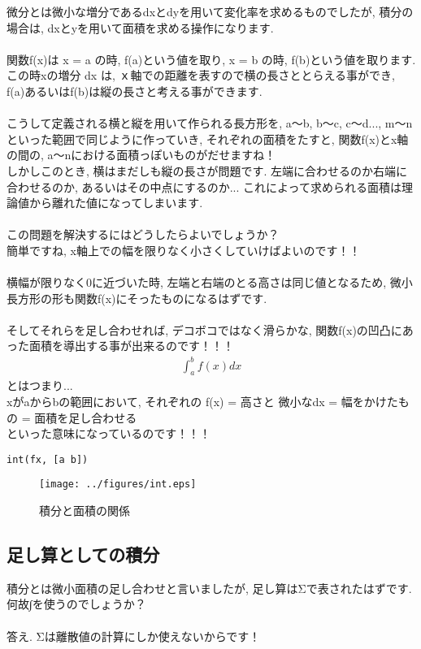 \documentclass[11pt,a4paper]{ujreport}
\begin{document}
微分とは微小な増分であるdxとdyを用いて変化率を求めるものでしたが, 積分の場合は, dxとyを用いて面積を求める操作になります.\\
\\
関数f(x)は x = a の時, f(a)という値を取り, x = b の時, f(b)という値を取ります. この時xの増分 dx は, ｘ軸での距離を表すので横の長さととらえる事ができ, f(a)あるいはf(b)は縦の長さと考える事ができます.\\
\\
こうして定義される横と縦を用いて作られる長方形を, a～b, b～c, c～d..., m～nといった範囲で同じように作っていき, それぞれの面積をたすと, 関数f(x)とx軸の間の, a～nにおける面積っぽいものがだせますね！\\
しかしこのとき, 横はまだしも縦の長さが問題です. 左端に合わせるのか右端に合わせるのか, あるいはその中点にするのか... これによって求められる面積は理論値から離れた値になってしまいます.\\
\\
この問題を解決するにはどうしたらよいでしょうか？\\
簡単ですね, x軸上での幅を限りなく小さくしていけばよいのです！！\\
\\
横幅が限りなく0に近づいた時, 左端と右端のとる高さは同じ値となるため, 微小長方形の形も関数f(x)にそったものになるはずです.\\
\\
そしてそれらを足し合わせれば, デコボコではなく滑らかな, 関数f(x)の凹凸にあった面積を導出する事が出来るのです！！！
\begin{eqnarray}
\label{eq:int2}
\int_a^b f(x) dx
\end{eqnarray}
とはつまり...\\
xがaからbの範囲において, それぞれの f(x) = 高さと 微小なdx = 幅をかけたもの = 面積を足し合わせる\\
といった意味になっているのです！！！



\begin{lstlisting}[caption=\ref{eq:int2}のコード,label=sc:int2]
int(fx, [a b])
\end{lstlisting}


\begin{figure}[H]
\label{im:integral}
  \centering
  \texttt{[image: ../figures/int.eps]}
  \caption{積分と面積の関係}
\end{figure}


\subsection{足し算としての積分}
積分とは微小面積の足し合わせと言いましたが, 足し算はΣで表されたはずです. 何故∫を使うのでしょうか？\\
\\
答え. Σは離散値の計算にしか使えないからです！\\
\end{document}
